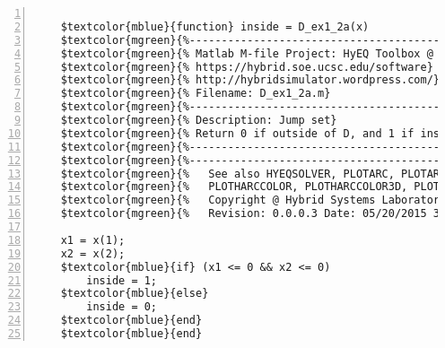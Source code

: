 %  
%  
%  
%  
  
  
\DefineShortVerb[fontfamily=courier,fontseries=m]{\$} 
\DefineShortVerb[fontfamily=courier,fontseries=b]{\#} 
  
\begin{Verbatim}[commandchars=\$\{\},numbers=left,numbersep=2pt] 

    $textcolor{mblue}{function} inside = D_ex1_2a(x)  
    $textcolor{mgreen}{%--------------------------------------------------------------------------} 
    $textcolor{mgreen}{% Matlab M-file Project: HyEQ Toolbox @  Hybrid Systems Laboratory (HSL), } 
    $textcolor{mgreen}{% https://hybrid.soe.ucsc.edu/software} 
    $textcolor{mgreen}{% http://hybridsimulator.wordpress.com/} 
    $textcolor{mgreen}{% Filename: D_ex1_2a.m} 
    $textcolor{mgreen}{%--------------------------------------------------------------------------} 
    $textcolor{mgreen}{% Description: Jump set} 
    $textcolor{mgreen}{% Return 0 if outside of D, and 1 if inside D} 
    $textcolor{mgreen}{%--------------------------------------------------------------------------} 
    $textcolor{mgreen}{%--------------------------------------------------------------------------} 
    $textcolor{mgreen}{%   See also HYEQSOLVER, PLOTARC, PLOTARC3, PLOTFLOWS, PLOTHARC,} 
    $textcolor{mgreen}{%   PLOTHARCCOLOR, PLOTHARCCOLOR3D, PLOTHYBRIDARC, PLOTJUMPS.} 
    $textcolor{mgreen}{%   Copyright @ Hybrid Systems Laboratory (HSL),} 
    $textcolor{mgreen}{%   Revision: 0.0.0.3 Date: 05/20/2015 3:42:00} 
     
    x1 = x(1); 
    x2 = x(2); 
    $textcolor{mblue}{if} (x1 <= 0 && x2 <= 0) 
        inside = 1; 
    $textcolor{mblue}{else} 
        inside = 0; 
    $textcolor{mblue}{end} 
    $textcolor{mblue}{end}  
\end{Verbatim}  
  
\UndefineShortVerb{\$} 
\UndefineShortVerb{\#} 
 